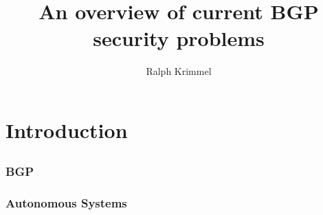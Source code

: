 \documentclass[notes=hide,yellow]{beamer}
\title{An overview of current BGP security problems}
\subtitle{ }
\author{Ralph Krimmel}
\begin{document}
	\begin{frame}
		\titlepage
	\end{frame}

	\begin{frame}
		\tableofcontents
	\end{frame}

\section{ Introduction}
\subsection*{}
\begin{frame}
	\frametitle{BGP}
\end{frame}

\begin{frame}
	\frametitle{Autonomous Systems}

\end{frame}
%
%
%
%
%
%
%
%
%
%
%
%
\end{document}
